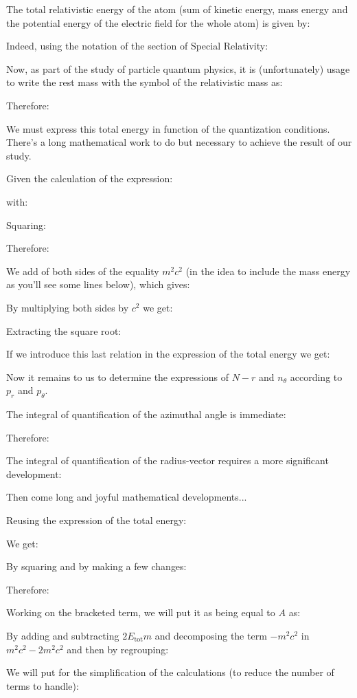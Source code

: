 	The total relativistic energy of the atom (sum of kinetic energy, mass energy  and the potential energy of the electric field for the whole atom) is given by: 
	
	Indeed, using the notation of the section of Special Relativity:
	
	Now, as part of the study of particle quantum physics, it is (unfortunately) usage to write the rest mass with the symbol of the relativistic mass as:
	
	Therefore:
	
	We must express this total energy in function of the quantization conditions. There's a long mathematical work to do but necessary to achieve the result of our study.

	Given the calculation of the expression:
	
	with:
	
	Squaring:
	
	Therefore:
	
	We add of both sides of the equality $m^2c^2$ (in the idea to include the mass energy as you'll see some lines below), which gives:
	
	By multiplying both sides by $c^2$ we get:
	
	Extracting the square root:
	
	If we introduce this last relation in the expression of the total energy we get:
	
	Now it remains to us to determine the expressions of $N-r$ and $n_\theta$ according to $p_r$ and $p_\theta$.

	The integral of quantification of the azimuthal angle is immediate:
	
	Therefore:
	
	The integral of quantification of the radius-vector requires a more significant development:
	
	Then come long and joyful mathematical developments...

	Reusing the expression of the total energy:
	
	We get:
	
	By squaring and by making a few changes:
	
	Therefore:
	
	Working on the bracketed term, we will put it as being equal to $A$ as:
	
	By adding and subtracting $2E_\text{tot}m$ and decomposing the term $-m^2c^2$ in $m^2c^2-2m^2c^2$ and then by regrouping:
	
	We will put for the simplification of the calculations (to reduce the number of terms to handle):
	
